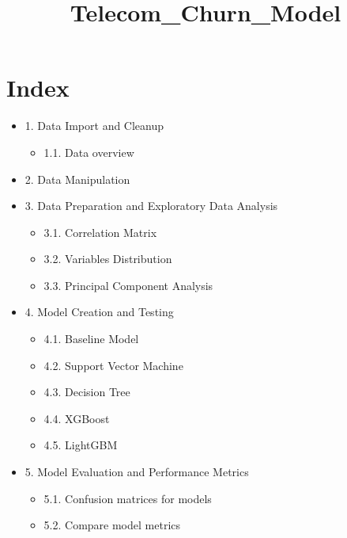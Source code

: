 \documentclass[11pt]{article}
\title{Telecom\_Churn\_Model}
\providecommand{\tightlist}{%
      \setlength{\itemsep}{0pt}\setlength{\parskip}{0pt}}
\begin{document}
    
    
    \maketitle
    
    

    
    \section{Index}\label{index}

\begin{itemize}
\tightlist
\item
  1. Data Import and Cleanup

  \begin{itemize}
  \tightlist
  \item
    1.1. Data overview
  \end{itemize}
\item
  2. Data Manipulation
\item
  3. Data Preparation and Exploratory Data Analysis

  \begin{itemize}
  \tightlist
  \item
    3.1. Correlation Matrix
  \item
    3.2. Variables Distribution
  \item
    3.3. Principal Component Analysis
  \end{itemize}
\item
  4. Model Creation and Testing

  \begin{itemize}
  \tightlist
  \item
    4.1. Baseline Model
  \item
    4.2. Support Vector Machine
  \item
    4.3. Decision Tree
  \item
    4.4. XGBoost
  \item
    4.5. LightGBM
  \end{itemize}
\item
  5. Model Evaluation and Performance Metrics

  \begin{itemize}
  \tightlist
  \item
    5.1. Confusion matrices for models
  \item
    5.2. Compare model metrics
  \end{itemize}
\end{itemize}
\end{document}
